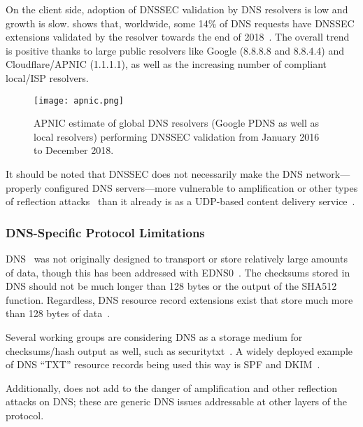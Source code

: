 On the client side, adoption of DNSSEC validation by DNS resolvers is low and
growth is slow.  shows that, worldwide, some 14\% of DNS requests
have DNSSEC extensions validated by the resolver towards the end of
2018~\cite{APNIC}. The overall trend is positive thanks to large public
resolvers like Google (8.8.8.8 and 8.8.4.4) and Cloudflare/APNIC (1.1.1.1), as
well as the increasing number of compliant local/ISP resolvers.

\begin{figure}[t]
    \centering
    \texttt{[image: apnic.png]}
    \caption{APNIC estimate of global DNS resolvers (Google PDNS as well as
    local resolvers) performing DNSSEC validation from January 2016 to December
    2018.}\label{fig:apnic}
\end{figure}

It should be noted that DNSSEC does not necessarily make the DNS network---\ie{}
properly configured DNS servers---more vulnerable to amplification or other types
of reflection attacks~\cite{Ariya} than it already is as a UDP-based content
delivery service~\cite{USCERT, Vixie}.


\subsubsection{DNS-Specific Protocol Limitations}

DNS~\cite{DNS1} was not originally designed to transport or store relatively
large amounts of data, though this has been addressed with EDNS0~\cite{EDNS}.
The checksums stored in DNS should not be much longer than 128 bytes or the
output of the SHA512 function. Regardless, DNS resource record extensions exist
that store much more than 128 bytes of data~\cite{CERT, IPSECKEY, DANE3, DANE1}.

Several working groups are considering DNS as a storage medium for
checksums/hash output as well, such as securitytxt~\cite{draft-sectxt}. A widely
deployed example of DNS ``TXT'' resource records being used this way is SPF and
DKIM~\cite{DKIM}.

Additionally, \SYSTEM{} does not add to the danger of amplification and other
reflection attacks on DNS; these are generic DNS issues addressable at other
layers of the protocol.

